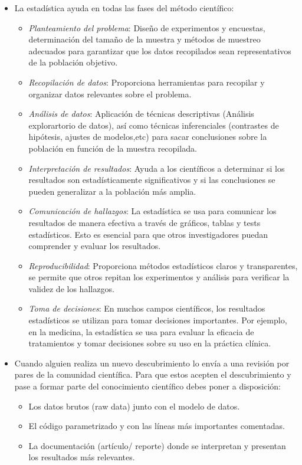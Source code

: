\documentclass[
  letterpaper,
  DIV=11,
  numbers=noendperiod]{scrreprt}
\begin{document}
\begin{itemize}
\item
  La estadística ayuda en todas las fases del método científico:

  \begin{itemize}
  \item
    {\emph{Planteamiento del problema}}: Diseño de experimentos y
    encuestas, determinación del tamaño de la muestra y métodos de
    muestreo adecuados para garantizar que los datos recopilados sean
    representativos de la población objetivo.
  \item
    {\emph{Recopilación de datos}}: Proporciona herramientas para
    recopilar y organizar datos relevantes sobre el problema.
  \item
    {\emph{Análisis de datos}}: Aplicación de técnicas descriptivas
    (Análisis explorartorio de datos), así como técnicas inferenciales
    (contrastes de hipótesis, ajustes de modelos,etc) para sacar
    conclusiones sobre la población en función de la muestra recopilada.
  \item
    {\emph{Interpretación de resultados}}: Ayuda a los científicos a
    determinar si los resultados son estadísticamente significativos y
    si las conclusiones se pueden generalizar a la población más amplia.
  \item
    {\emph{Comunicación de hallazgos}}: La estadística se usa para
    comunicar los resultados de manera efectiva a través de gráficos,
    tablas y tests estadísticos. Esto es esencial para que otros
    investigadores puedan comprender y evaluar los resultados.
  \item
    {\emph{Reproducibilidad}}: Proporciona métodos estadísticos claros y
    transparentes, se permite que otros repitan los experimentos y
    análisis para verificar la validez de los hallazgos.
  \item
    {\emph{Toma de decisiones}}: En muchos campos científicos, los
    resultados estadísticos se utilizan para tomar decisiones
    importantes. Por ejemplo, en la medicina, la estadística se usa para
    evaluar la eficacia de tratamientos y tomar decisiones sobre su uso
    en la práctica clínica.
  \end{itemize}
\item
  Cuando alguien realiza un nuevo descubrimiento lo envía a una revisión
  por pares de la comunidad científica. Para que estos acepten el
  descubrimiento y pase a formar parte del conocimiento científico debes
  poner a disposición:

  \begin{itemize}
  \item
    Los datos brutos (raw data) junto con el modelo de datos.
  \item
    El código parametrizado y con las líneas más importantes comentadas.
  \item
    La documentación (artículo/ reporte) donde se interpretan y
    presentan los resultados más relevantes.
  \end{itemize}
\end{itemize}
\end{document}

